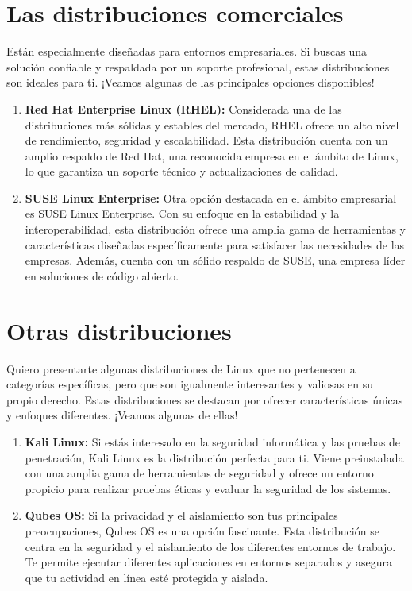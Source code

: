 \documentclass[
  jou,
  floatsintext,
  longtable,
  a4paper,
  nolmodern,
  notxfonts,
  notimes,
  12pt,
  colorlinks=true,linkcolor=blue,citecolor=blue,urlcolor=blue]{apa7}
\begin{document}
\section{Las distribuciones
comerciales}\label{las-distribuciones-comerciales}

Están especialmente diseñadas para entornos empresariales. Si buscas una
solución confiable y respaldada por un soporte profesional, estas
distribuciones son ideales para ti. ¡Veamos algunas de las principales
opciones disponibles!

\begin{enumerate}
\def\labelenumi{\arabic{enumi}.}
\item
  \textbf{Red Hat Enterprise Linux (RHEL):} Considerada una de las
  distribuciones más sólidas y estables del mercado, RHEL ofrece un alto
  nivel de rendimiento, seguridad y escalabilidad. Esta distribución
  cuenta con un amplio respaldo de Red Hat, una reconocida empresa en el
  ámbito de Linux, lo que garantiza un soporte técnico y actualizaciones
  de calidad.
\item
  \textbf{SUSE Linux Enterprise:} Otra opción destacada en el ámbito
  empresarial es SUSE Linux Enterprise. Con su enfoque en la estabilidad
  y la interoperabilidad, esta distribución ofrece una amplia gama de
  herramientas y características diseñadas específicamente para
  satisfacer las necesidades de las empresas. Además, cuenta con un
  sólido respaldo de SUSE, una empresa líder en soluciones de código
  abierto.
\end{enumerate}

\section{Otras distribuciones}\label{otras-distribuciones}

Quiero presentarte algunas distribuciones de Linux que no pertenecen a
categorías específicas, pero que son igualmente interesantes y valiosas
en su propio derecho. Estas distribuciones se destacan por ofrecer
características únicas y enfoques diferentes. ¡Veamos algunas de ellas!

\begin{enumerate}
\def\labelenumi{\arabic{enumi}.}
\item
  \textbf{Kali Linux:} Si estás interesado en la seguridad informática y
  las pruebas de penetración, Kali Linux es la distribución perfecta
  para ti. Viene preinstalada con una amplia gama de herramientas de
  seguridad y ofrece un entorno propicio para realizar pruebas éticas y
  evaluar la seguridad de los sistemas.
\item
  \textbf{Qubes OS:} Si la privacidad y el aislamiento son tus
  principales preocupaciones, Qubes OS es una opción fascinante. Esta
  distribución se centra en la seguridad y el aislamiento de los
  diferentes entornos de trabajo. Te permite ejecutar diferentes
  aplicaciones en entornos separados y asegura que tu actividad en línea
  esté protegida y aislada.
\end{enumerate}
\end{document}
